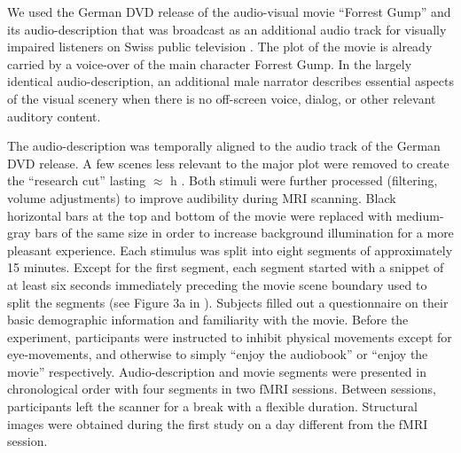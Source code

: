 \documentclass[english]{article}
\begin{document}
We used the German DVD release \citep{ForrestGumpDVD} of the audio-visual movie
``Forrest Gump'' \citep{ForrestGumpMovie} and its audio-description that was
broadcast as an additional audio track for visually impaired listeners on Swiss
public television \citep{ForrestGumpGermanAD}.
The plot of the movie is already carried by a voice-over of the main character
Forrest Gump.
In the largely identical audio-description, an additional male narrator
describes essential aspects of the visual scenery when there is no off-screen
voice, dialog, or other relevant auditory content.

The audio-description was temporally aligned to the audio track of the German
DVD release. A few scenes less relevant to the major plot were removed to create
the ``research cut'' lasting $\approx$ \unit[2]{h} \citep{hanke2014audiomovie,
hanke2016simultaneous}.
Both stimuli were further processed (filtering, volume adjustments) to improve
audibility during MRI scanning. Black horizontal bars at the top and bottom of
the movie were replaced with medium-gray bars of the same size in order to
increase background illumination for a more pleasant experience.
Each stimulus was split into eight segments of approximately 15 minutes. Except
for the first segment, each segment started with a snippet of at least six
seconds immediately preceding the movie scene boundary used to split the
segments (see Figure 3a in \citep{hanke2014audiomovie}).
Subjects filled out a questionnaire on their basic demographic information
and familiarity with the movie.
Before the experiment, participants were instructed to inhibit physical
movements except for eye-movements, and otherwise to simply ``enjoy the
audiobook'' or ``enjoy the movie'' respectively.
Audio-description and movie segments were presented in chronological order with
four segments in two fMRI sessions. Between sessions, participants left the
scanner for a break with a flexible duration. Structural images were obtained
during the first study on a day different from the fMRI session.

\end{document}
